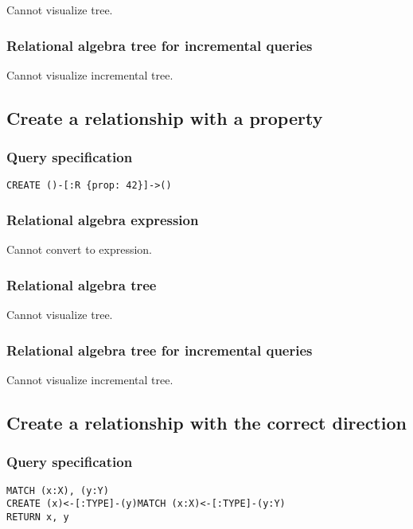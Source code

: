 Cannot visualize tree.

\subsubsection*{Relational algebra tree for incremental queries}

Cannot visualize incremental tree.

\subsection{Create a relationship with a property}

\subsubsection*{Query specification}

\begin{lstlisting}
CREATE ()-[:R {prop: 42}]->()
\end{lstlisting}

\subsubsection*{Relational algebra expression}

Cannot convert to expression.

\subsubsection*{Relational algebra tree}

Cannot visualize tree.

\subsubsection*{Relational algebra tree for incremental queries}

Cannot visualize incremental tree.

\subsection{Create a relationship with the correct direction}

\subsubsection*{Query specification}

\begin{lstlisting}
MATCH (x:X), (y:Y)
CREATE (x)<-[:TYPE]-(y)MATCH (x:X)<-[:TYPE]-(y:Y)
RETURN x, y
\end{lstlisting}

